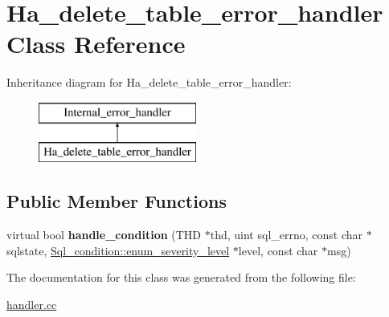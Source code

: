 \hypertarget{classHa__delete__table__error__handler}{}\section{Ha\+\_\+delete\+\_\+table\+\_\+error\+\_\+handler Class Reference}
\label{classHa__delete__table__error__handler}
Inheritance diagram for Ha\+\_\+delete\+\_\+table\+\_\+error\+\_\+handler\+:\begin{figure}[H]
\begin{center}
\leavevmode
\includegraphics[height=2.000000cm]{classHa__delete__table__error__handler}
\end{center}
\end{figure}
\subsection*{Public Member Functions}
\begin{DoxyCompactItemize}
\item 
\mbox{\label{classHa__delete__table__error__handler_ae7faa640ca4590b0a44b5c974f1ef5b6}} 
virtual bool {\bfseries handle\+\_\+condition} (T\+HD $\ast$thd, uint sql\+\_\+errno, const char $\ast$sqlstate, \mbox{\hyperlink{classSql__condition_ab0602581e19cddb609bfe10c44be4e83}{Sql\+\_\+condition\+::enum\+\_\+severity\+\_\+level}} $\ast$level, const char $\ast$msg)
\end{DoxyCompactItemize}


The documentation for this class was generated from the following file\+:\begin{DoxyCompactItemize}
\item 
\mbox{\hyperlink{handler_8cc}{handler.\+cc}}\end{DoxyCompactItemize}
